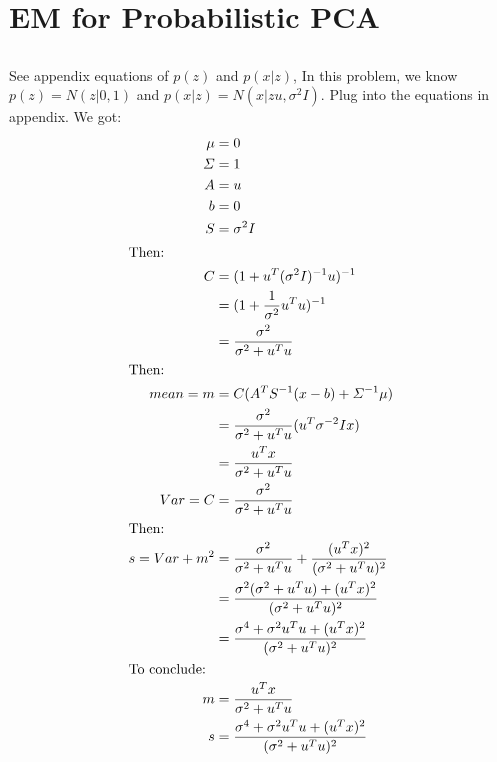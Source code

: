 \documentclass{article}
\begin{document}
\section{EM for Probabilistic PCA}
\subsection{}
See appendix equations of $p(z)$ and $p(x|z)$,
In this problem, we know $p(z)=N(z|0,1)$ and $p(x|z) = N(x|zu,\sigma ^2I)$. Plug into the equations in appendix. We got:
\begin{align*}
    \mu  &= 0\\
    \varSigma &= 1\\
    A &= u\\
    b &= 0\\
    S &= \sigma ^2I\\
\intertext{Then:}
    C &= (1+u^T(\sigma ^2I)^{-1}u)^{-1}\\
    &= (1+\frac{1}{\sigma ^2}u^Tu)^{-1}\\
    &= \frac{\sigma ^2}{\sigma ^2 + u^Tu}\\
\intertext{Then:}
    mean = m &= C(A^TS^{-1}(x-b)+\varSigma^{-1}\mu)\\
    &= \frac{\sigma ^2}{\sigma ^2 + u^Tu}(u^T\sigma ^{-2}Ix)\\
    &= \frac{u^Tx}{\sigma ^2 + u^Tu}\\
    Var = C &= \frac{\sigma ^2}{\sigma ^2 + u^Tu}\\
\intertext{Then:}
    s = Var + m^2 &=\frac{\sigma ^2}{\sigma ^2 + u^Tu} + \frac{(u^Tx)^2}{(\sigma ^2 + u^Tu)^2}\\
    &=\frac{\sigma ^2(\sigma ^2 + u^Tu)+(u^Tx)^2}{(\sigma ^2 + u^Tu)^2}\\
    &=\frac{\sigma ^4+\sigma ^2u^Tu+(u^Tx)^2}{(\sigma ^2 + u^Tu)^2}\\
\intertext{To conclude:}
    m &= \frac{u^Tx}{\sigma ^2 + u^Tu}\\
    s &=\frac{\sigma ^4+\sigma ^2u^Tu+(u^Tx)^2}{(\sigma ^2 + u^Tu)^2}\\
\end{align*}
\end{document}
